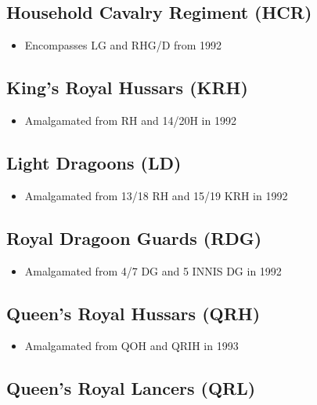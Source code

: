 \subsection*{Household Cavalry Regiment (HCR)}

\begin{itemize}
\item Encompasses LG and RHG/D from 1992
\end{itemize}

\subsection*{King's Royal Hussars (KRH)}

\begin{itemize}
\item Amalgamated from RH and 14/20H in 1992
\end{itemize}

\subsection*{Light Dragoons (LD)}

\begin{itemize}
\item Amalgamated from 13/18 RH and 15/19 KRH in 1992
\end{itemize}

\subsection*{Royal Dragoon Guards (RDG)}

\begin{itemize}
\item Amalgamated from 4/7 DG and 5 INNIS DG in 1992
\end{itemize}

\subsection*{Queen's Royal Hussars (QRH)}

\begin{itemize}
\item Amalgamated from QOH and QRIH in 1993
\end{itemize}

\subsection*{Queen's Royal Lancers (QRL)}

